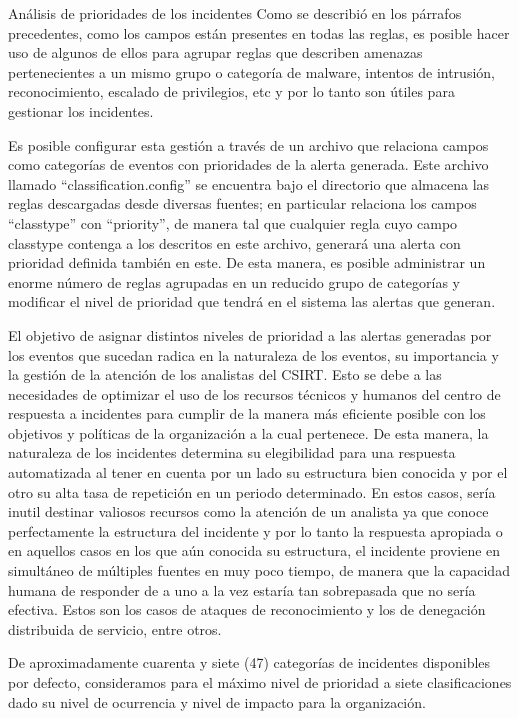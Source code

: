 \begin{section}{Análisis de prioridades de los incidentes}
    Como se describió en los párrafos precedentes, como los campos están presentes en todas las reglas, es posible hacer uso de algunos de ellos para agrupar reglas que describen amenazas pertenecientes a un mismo grupo o categoría de malware, intentos de intrusión, reconocimiento, escalado de privilegios, etc y por lo tanto son útiles para gestionar los incidentes. \par
	Es posible configurar esta gestión a través de un archivo que relaciona campos como categorías de eventos con prioridades de la alerta generada. Este archivo llamado “classification.config” se encuentra bajo el directorio que almacena las reglas descargadas desde diversas fuentes; en particular relaciona los campos “classtype” con “priority”, de manera tal que cualquier regla cuyo campo classtype contenga a los descritos en este archivo, generará una alerta con prioridad definida también en este. De esta manera, es posible administrar un enorme número de reglas agrupadas en un reducido grupo de categorías y modificar el nivel de prioridad que tendrá en el sistema las alertas que generan. \par
	El objetivo de asignar distintos niveles de prioridad a las alertas generadas por los eventos que sucedan radica en la naturaleza de los eventos, su importancia y la gestión de la atención de los analistas del CSIRT. Esto se debe a las necesidades de optimizar el uso de los recursos técnicos y humanos del centro de respuesta a incidentes para cumplir de la manera más eficiente posible con los objetivos y políticas de la organización a la cual pertenece. De esta manera, la naturaleza de los incidentes determina su elegibilidad para una respuesta automatizada al tener en cuenta por un lado su estructura bien conocida y por el otro su alta tasa de repetición en un periodo determinado. En estos casos, sería inutil destinar valiosos recursos como la atención de un analista ya que conoce perfectamente la estructura del incidente y por lo tanto la respuesta apropiada o en aquellos casos en los que aún conocida su estructura, el incidente proviene en simultáneo de múltiples fuentes en muy poco tiempo, de manera que la capacidad humana de responder de a uno a la vez estaría tan sobrepasada que no sería efectiva. Estos son los casos de ataques de reconocimiento y los de denegación distribuida de servicio, entre otros. \par
	De aproximadamente cuarenta y siete (47) categorías de incidentes disponibles por defecto, consideramos para el máximo nivel de prioridad a siete clasificaciones dado su nivel de ocurrencia y nivel de impacto para la organización. 

\end{section}
